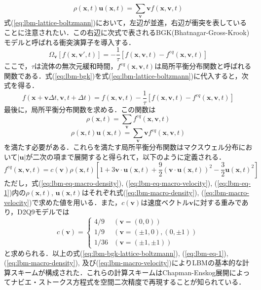 \begin{equation}
  \rho(\bm{x}, t) \bm{u}(\bm{x}, t) = \sum_{\bm{v}} \bm{v} f(\bm{x}, \bm{v}, t)
  \label{eq:lbm-macro-velocity}
\end{equation}
式(\ref{eq:lbm-lattice-boltzmann})において，左辺が並進，右辺が衝突を表していることに注意されたい．この右辺に次式で表されるBGK(Bhatnagar-Gross-Krook)モデルと呼ばれる衝突演算子\cite{todo}を導入する．
\begin{equation}
  \Omega_{\bm{v}}\left[ f(\bm{x}, \bm{v}', t) \right] = -\frac{1}{\tau} \left[ f(\bm{x}, \bm{v}, t) - f^{eq}(\bm{x}, \bm{v}, t) \right]
  \label{eq:lbm-bgk}
\end{equation}
ここで，$\tau$は流体の無次元緩和時間，$f^{eq}(\bm{x}, \bm{v}, t)$は局所平衡分布関数と呼ばれる関数である．式(\ref{eq:lbm-bgk})を式(\ref{eq:lbm-lattice-boltzmann})に代入すると，次式を得る．
\begin{equation}
  f(\bm{x}+\bm{v}\Delta t, \bm{v}, t+\Delta t) = f(\bm{x}, \bm{v}, t) - \frac{1}{\tau} \left[ f(\bm{x}, \bm{v}, t) - f^{eq}(\bm{x}, \bm{v}, t) \right]
  \label{eq:lbm-bgk-lattice-boltzmann}
\end{equation}
最後に，局所平衡分布関数を求める．この関数は
\begin{equation}
  \rho(\bm{x}, t) = \sum_{\bm{v}} f^{eq}(\bm{x}, \bm{v}, t)
  \label{eq:lbm-eq-macro-density}
\end{equation}
\begin{equation}
  \rho(\bm{x}, t) \bm{u}(\bm{x}, t) = \sum_{\bm{v}} \bm{v} f^{eq}(\bm{x}, \bm{v}, t)
  \label{eq:lbm-eq-macro-velocity}
\end{equation}
を満たす必要がある．これらを満たす局所平衡分布関数はマクスウェル分布\cite{todo}において$|\bm{u}|$が二次の項まで展開すると得られて，以下のように定義される．
\begin{equation}
  f^{eq}(\bm{x}, \bm{v}, t) = c(\bm{v}) \rho(\bm{x}, t) \left[ 1 + 3\bm{v} \cdot \bm{u}(\bm{x}, t) + \frac{9}{2}(\bm{v} \cdot \bm{u}(\bm{x}, t))^2 - \frac{3}{2}\bm{u}(\bm{x}, t)^2 \right]
  \label{eq:lbm-eq-1}
\end{equation}
ただし，式(\ref{eq:lbm-eq-macro-density}), (\ref{eq:lbm-eq-macro-velocity}), (\ref{eq:lbm-eq-1})内の$\rho(\bm{x}, t)$, $\bm{u}(\bm{x}, t)$はそれぞれ式(\ref{eq:lbm-macro-density}), (\ref{eq:lbm-macro-velocity})で求めた値を用いる．また，$c(\bm{v})$は速度ベクトル$\bm{v}$に対する重みであり，D2Q9モデルでは
\begin{equation}
  c(\bm{v}) = \left\{
    \begin{array}{ll}
      4/9 & (\bm{v} = (0, 0)) \\
      1/9 & (\bm{v} = (\pm 1, 0), (0, \pm 1)) \\
      1/36 & (\bm{v} = (\pm 1, \pm 1))
    \end{array}
  \right.
  \label{eq:lbm-weight}
\end{equation}
と求められる．以上の式(\ref{eq:lbm-bgk-lattice-boltzmann}), (\ref{eq:lbm-eq-1}), (\ref{eq:lbm-macro-density}), 及び(\ref{eq:lbm-macro-velocity})によりLBMの基本的な計算スキームが構成された．これらの計算スキームはChapman-Enskog展開によってナビエ・ストークス方程式を空間二次精度で再現することが知られている\cite{todo}．

